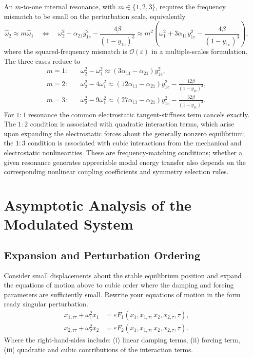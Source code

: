 \documentclass[11pt]{article}
\newenvironment{assignmentinstruction}{\par\begingroup\color{blue}}{\par\endgroup}
\begin{document}
An $m$-to-one internal resonance, with $m\in\{1,2,3\}$, requires the frequency mismatch to be small on the perturbation scale, equivalently
\begin{equation}\label{eq:internal-resonance-general}
\hat{\omega}_2\approx m\hat{\omega}_1
\quad\Longleftrightarrow\quad
\omega_2^2+\alpha_{21}y_{1e}^2-\frac{4\beta}{(1-y_{1e})^3}
\approx m^2\left(\omega_1^2+3\alpha_{11}y_{1e}^2-\frac{4\beta}{(1-y_{1e})^3}\right),
\end{equation}
where the squared-frequency mismatch is $\mathcal{O}(\varepsilon)$ in a multiple-scales formulation. The three cases reduce to
\begin{align*}
m=1:\quad &\omega_2^2-\omega_1^2\approx(3\alpha_{11}-\alpha_{21})y_{1e}^2,\\
m=2:\quad &\omega_2^2-4\omega_1^2\approx(12\alpha_{11}-\alpha_{21})y_{1e}^2-\frac{12\beta}{(1-y_{1e})^3},\\
m=3:\quad &\omega_2^2-9\omega_1^2\approx(27\alpha_{11}-\alpha_{21})y_{1e}^2-\frac{32\beta}{(1-y_{1e})^3}.
\end{align*}
For $1{:}1$ resonance the common electrostatic tangent-stiffness term cancels exactly. The $1{:}2$ condition is associated with quadratic interaction terms, which arise upon expanding the electrostatic forces about the generally nonzero equilibrium; the $1{:}3$ condition is associated with cubic interactions from the mechanical and electrostatic nonlinearities. These are frequency-matching conditions; whether a given resonance generates appreciable modal energy transfer also depends on the corresponding nonlinear coupling coefficients and symmetry selection rules.

\section{Asymptotic Analysis of the Modulated System}
\subsection{Expansion and Perturbation Ordering}
\begin{assignmentinstruction}
Consider small displacements about the stable equilibrium position and expand the equations of motion above to cubic order where the damping and forcing parameters are sufficiently small. Rewrite your equations of motion in the form ready singular perturbation.
\[
\begin{aligned}
x_{1,\tau\tau}+\omega_1^2x_1 &= \varepsilon F_1(x_1,x_{1,\tau},x_2,x_{2,\tau},\tau),\\
x_{2,\tau\tau}+\omega_2^2x_2 &= \varepsilon F_2(x_1,x_{1,\tau},x_2,x_{2,\tau},\tau).
\end{aligned}
\]
Where the right-hand-sides include: (i) linear damping terms, (ii) forcing term, (iii) quadratic and cubic contributions of the interaction terms.
\end{assignmentinstruction}
\end{document}
